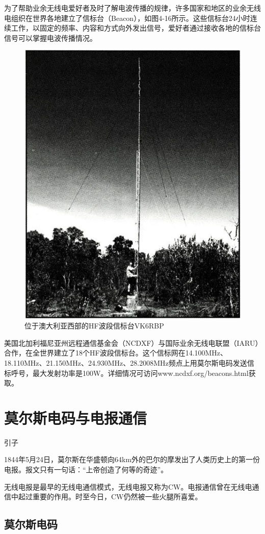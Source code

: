 \documentclass[12pt,UTF8]{ctexbook}
\begin{document}
为了帮助业余无线电爱好者及时了解电波传播的规律，许多国家和地区的业余无线电组织在世界各地建立了信标台（Beacon），如图4-16所示。这些信标台24小时连续工作，以固定的频率、内容和方式向外发出信号，爱好者通过接收各地的信标台信号可以掌握电波传播情况。

\begin{figure}[htbp]
	\centering
	\includegraphics[width=0.7\linewidth]{59}
	\caption{位于澳大利亚西部的HF波段信标台VK6RBP}
	\label{fig:1}
\end{figure}

美国北加利福尼亚州远程通信基金会（NCDXF）与国际业余无线电联盟（IARU）合作，在全世界建立了18个HF波段信标台。这个信标网在14.100MHz、18.110MHz、21.150MHz、24.930MHz、28.2008MHz频点上用莫尔斯电码发送信标呼号，最大发射功率是100W。详细情况可访问www.ncdxf.org/beacons.html获取。

\chapter{莫尔斯电码与电报通信}

引子

1844年5月24日，莫尔斯在华盛顿向64km外的巴尔的摩发出了人类历史上的第一份电报。报文只有一句话：“上帝创造了何等的奇迹”。

无线电报是最早的无线电通信模式，无线电报又称为CW。电报通信曾在无线电通信中起过重要的作用。时至今日，CW仍然被一些火腿所喜爱。

\section{莫尔斯电码}
\end{document}
